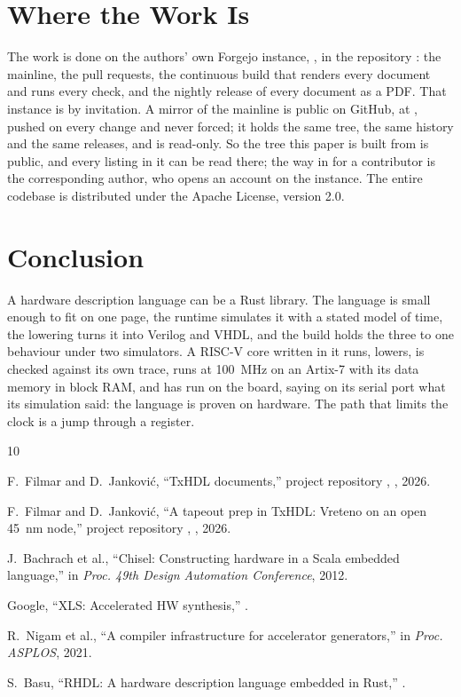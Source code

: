 \documentclass[journal,9pt]{IEEEtran}
\begin{document}
\section{Where the Work Is}
\label{sec:p-where}

The work is done on the authors' own Forgejo instance,
, in the repository : the
mainline, the pull requests, the continuous build that renders every
document and runs every check, and the nightly release of every
document as a PDF. That instance is by invitation. A mirror of the
mainline is public on GitHub, at ,
pushed on every change and never forced; it holds the same tree, the
same history and the same releases, and is read-only. So the tree
this paper is built from is public, and every listing in it can be
read there; the way in for a contributor is the corresponding author,
who opens an account on the instance. The entire codebase is distributed under the
Apache License, version 2.0.

\section{Conclusion}
\label{sec:p-conclusion}

A hardware description language can be a Rust library. The language
is small enough to fit on one page, the runtime simulates it with a
stated model of time, the lowering turns it into Verilog and VHDL,
and the build holds the three to one behaviour under two simulators.
A RISC-V core written in it runs, lowers, is checked against its own
trace, runs at 100~MHz on an Artix-7 with its data memory in block
RAM, and has run on the board, saying on its serial port what its
simulation said: the language is proven on hardware. The path that
limits the clock is a jump through a register.

\begin{thebibliography}{10}

F.~Filmar and D.~Janković, ``TxHDL documents,'' project repository
, , 2026.

F.~Filmar and D.~Janković, ``A tapeout prep in TxHDL: Vreteno on an
open 45~nm node,'' project repository ,
, 2026.

J.~Bachrach et al., ``Chisel: Constructing hardware in a Scala embedded
language,'' in \emph{Proc. 49th Design Automation Conference}, 2012.

Google, ``XLS: Accelerated HW synthesis,'' .

R.~Nigam et al., ``A compiler infrastructure for accelerator
generators,'' in \emph{Proc. ASPLOS}, 2021.

S.~Basu, ``RHDL: A hardware description language embedded in Rust,''
.

\end{thebibliography}
\end{document}
